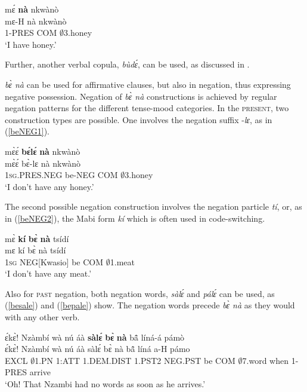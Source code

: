\begin{exe}
\ex\label{bena1a}
  \glll  mɛ́ {\bfseries nà} nkwànò  \\
        mɛ-H nà nkwànò \\
           1-PRES COM $\emptyset$3.honey      \\
    \trans `I have honey.'
\end{exe}

\noindent Further, another verbal copula, {\itshape bùdɛ́}, can be used, as discussed in .

{\itshape bɛ̀ nà} can be used for affirmative clauses, but also in negation, thus expressing negative possession. Negation of {\itshape bɛ̀ nà} constructions is achieved by regular negation patterns for the different tense-mood categories. In the \textsc{present}, two construction types are possible. One involves the negation suffix -{\itshape lɛ}, as in (\ref{beNEG1}).


\begin{exe} 
\ex\label{beNEG1}
  \glll mɛ̀ɛ́ {\bfseries bɛ́lɛ́} {\bfseries nà} nkwànò \\
       mɛ̀ɛ́ bɛ̀-lɛ nà nkwànò \\
       1\textsc{sg}.PRES.NEG be-NEG COM $\emptyset$3.honey  \\
    \trans `I don't have any honey.'
\end{exe}

\noindent The second possible negation construction involves the negation particle {\itshape tí}, or, as in (\ref{beNEG2}), the Mabi form {\itshape kí} which is often used in code-switching.

\begin{exe} 
\ex\label{beNEG2}
  \glll mɛ̀ {\bfseries kí} {\bfseries bɛ̀} {\bfseries nà} tsídí \\
       mɛ kí bɛ̀ nà tsídí \\
       1\textsc{sg} NEG[Kwasio] be COM $\emptyset$1.meat  \\
    \trans `I don't have any meat.'
\end{exe}

Also for \textsc{past} negation, both negation words, {\itshape sàlɛ́} and {\itshape pálɛ́} can be used, as (\ref{besale}) and (\ref{bepale}) show. The negation words precede {\itshape bɛ̀ nà} as they would with any other verb.

\begin{exe} 
\ex\label{besale}
  \glll ɛ́kɛ̀! Nzàmbí wà nú áà {\bfseries sàlɛ́} {\bfseries bɛ̀} {\bfseries nà} bã̂ líná-á pámò \\
      ɛ́kɛ̀! Nzàmbí wà nú áà sàlɛ́ bɛ̀ nà bã̂ líná a-H pámo \\
        EXCL $\emptyset$1.PN 1:ATT 1.DEM.DIST 1.PST2 NEG.PST be COM $\emptyset$7.word when 1-PRES arrive  \\
    \trans `Oh! That Nzambi had no words as soon as he arrives.'
\end{exe}


